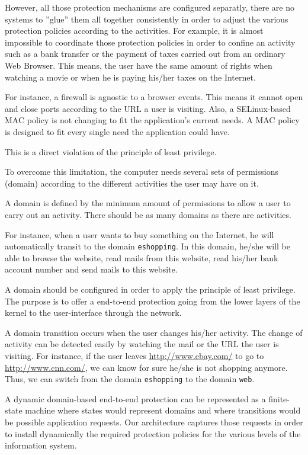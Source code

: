 \documentclass[conference]{IEEEtran}
\begin{document}
		However, all those protection mechanisms are configured separatly, there are no systems to ''glue'' them all together consistently in order to adjust the various protection policies according to the activities. For example, it is almost impossible to coordinate those protection policies in order to confine an activity such as a bank transfer or the payment of taxes carried out from an ordinary Web Browser. This means, the user have the same amount of rights when watching a movie or when he is paying his/her taxes on the Internet.

		For instance, a firewall is agnostic to a browser events. This means it cannot open and close ports according to the URL a user is visiting.
		Also, a SELinux-based MAC policy is not changing to fit the application's current needs. A MAC policy is designed to fit every single need the application could have.

		This is a direct violation of the principle of least privilege.

		To overcome this limitation, the computer needs several sets of permissions (domain) according to the different activities the user may have on it.

		A domain is defined by the minimum amount of permissions to allow a user to carry out an activity. There should be as many domains as there are activities.

		For instance, when a user wants to buy something on the Internet, he will automatically transit to the domain \texttt{eshopping}. 
		In this domain, he/she will be able to browse the website, read mails from this website, read his/her bank account number and send mails to this website.

		A domain should be configured in order to apply the principle of least privilege. 
		The purpose is to offer a end-to-end  protection going from the lower layers of the kernel to the user-interface through the network.

		A domain transition occurs when the user changes his/her activity. The change of activity can be detected easily by watching the mail or the URL the user is visiting. 
		For instance, if the user leaves \url{http://www.ebay.com/} to go to \url{http://www.cnn.com/}, we can know for sure he/she is not shopping anymore. 
		Thus, we can switch from the domain \texttt{eshopping} to the domain \texttt{web}.

		A dynamic domain-based end-to-end protection can be represented as a finite-state machine where states would represent domains and where transitions would be possible application requests. Our architecture captures those requests in order to install dynamically the required protection policies for the various levels of the information system.
\end{document}
